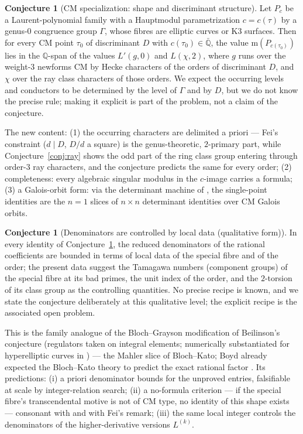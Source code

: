 \documentclass[11pt]{article}
\newcommand{\m}{\mathrm{m}}                 %
\newcommand{\Qq}{\mathbb{Q}}
\theoremstyle{definition}
\newtheorem{conjecture}[theorem]{Conjecture}
\theoremstyle{remark}
\begin{document}
\begin{conjecture}[CM specialization: shape and discriminant
structure]\label{conj:umbA}
Let $P_c$ be a Laurent-polynomial family with a Hauptmodul
parametrization $c=c(\tau)$ by a genus-$0$ congruence group
$\Gamma$, whose fibres are elliptic curves or K3 surfaces. Then for
every CM point $\tau_0$ of discriminant $D$ with
$c(\tau_0)\in\bar{\Qq}$, the value $\m(P_{c(\tau_0)})$ lies in the
$\Qq$-span of the values $L'(g,0)$ and $L(\chi,2)$, where $g$ runs
over the weight-$3$ newforms CM by Hecke characters of the orders of
discriminant $D$, and $\chi$ over the ray class characters of those
orders. We expect the occurring levels and conductors to be
determined by the level of $\Gamma$ and by $D$, but we do not know
the precise rule; making it explicit is part of the problem, not a
claim of the conjecture.
\end{conjecture}

The new content: (1) the occurring characters are delimited a priori
--- Fei's constraint ($d\mid D$, $D/d$ a square) is the
genus-theoretic, $2$-primary part, while Conjecture~\ref{conj:ray}
shows the odd part of the ring class group entering through
order-$3$ ray characters, and the conjecture predicts
the same for every
order; (2) completeness: every algebraic singular modulus in the
$c$-image carries a formula; (3) a Galois-orbit form: via the
determinant machine of \cite{ST}, the single-point identities are
the $n=1$ slices of $n\times n$ determinant identities over CM
Galois orbits.

\begin{conjecture}[Denominators are controlled by local
data \textup{(}qualitative form\textup{)}]\label{conj:umbB}
In every identity of Conjecture~\ref{conj:umbA},
the reduced denominators of the rational coefficients are bounded
in terms of local data of the special fibre and of the order; the
present data suggest the Tamagawa numbers \textup{(}component
groups\textup{)} of the special fibre at its bad primes, the unit
index of the order, and the $2$-torsion of its class group as the
controlling quantities. No precise recipe is known, and we state
the conjecture deliberately at this qualitative level; the
explicit recipe is the associated open problem.
\end{conjecture}

This is the family analogue of the Bloch--Grayson modification of
Beilinson's conjecture \cite{BloG} (regulators taken on integral
elements; numerically substantiated for hyperelliptic curves in
\cite{DdJZ}) --- the Mahler slice of Bloch--Kato; Boyd already
expected the Bloch--Kato theory to predict the exact rational
factor \cite{Boyd98}. Its predictions: (i) a priori denominator
bounds for the unproved entries, falsifiable at scale by
integer-relation search; (ii) a no-formula criterion --- if the
special fibre's transcendental motive is not of CM type, no identity
of this shape exists --- consonant with \cite{Sch} and with Fei's
remark; (iii) the same local integer controls the denominators of
the higher-derivative versions $L^{(k)}$.
\end{document}

